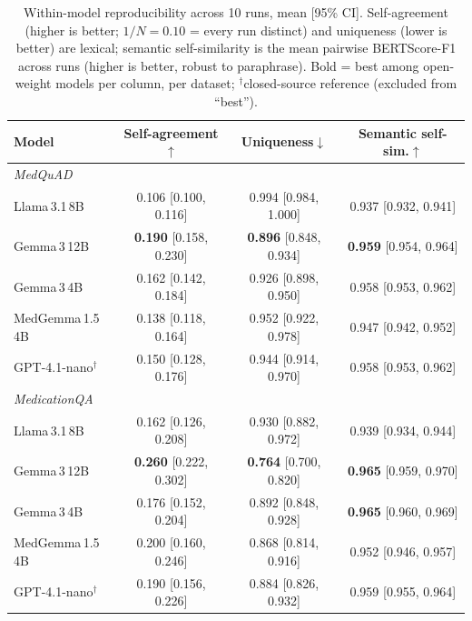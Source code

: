 \documentclass[11pt]{article}
\providecommand{\DIFaddbegin}{} %
\providecommand{\DIFaddincludegraphics}[2][]{{\color{blue}\fbox{\DIFOincludegraphics[#1]{#2}}}} %
\DeclareRobustCommand{\DIFaddbegin}{\DIFOaddbegin \let\includegraphics\DIFaddincludegraphics} %
\begin{document}
\DIFaddbegin \begin{table}[h]
\centering
\caption{Within-model reproducibility across 10 runs, mean [95\% CI].
Self-agreement (higher is better; $1/N{=}0.10$ = every run distinct) and
uniqueness (lower is better) are lexical; semantic self-similarity is the
mean pairwise BERTScore-F1 across runs (higher is better, robust to
paraphrase). Bold = best among open-weight models per column, per dataset;
$^\dagger$closed-source reference (excluded from ``best'').}
\label{tab:repro}
\footnotesize
\begin{tabular}{lccc}
\toprule
\textbf{Model} & \textbf{Self-agreement}$\uparrow$ & \textbf{Uniqueness}$\downarrow$ & \textbf{Semantic self-sim.}$\uparrow$ \\
\midrule
\multicolumn{4}{l}{\emph{MedQuAD}}\\
Llama\,3.1\,8B      & 0.106 [0.100, 0.116] & 0.994 [0.984, 1.000] & 0.937 [0.932, 0.941] \\
Gemma\,3\,12B       & \textbf{0.190} [0.158, 0.230] & \textbf{0.896} [0.848, 0.934] & \textbf{0.959} [0.954, 0.964] \\
Gemma\,3\,4B        & 0.162 [0.142, 0.184] & 0.926 [0.898, 0.950] & 0.958 [0.953, 0.962] \\
MedGemma\,1.5\,4B   & 0.138 [0.118, 0.164] & 0.952 [0.922, 0.978] & 0.947 [0.942, 0.952] \\
GPT-4.1-nano$^\dagger$ & 0.150 [0.128, 0.176] & 0.944 [0.914, 0.970] & 0.958 [0.953, 0.962] \\
\midrule
\multicolumn{4}{l}{\emph{MedicationQA}}\\
Llama\,3.1\,8B      & 0.162 [0.126, 0.208] & 0.930 [0.882, 0.972] & 0.939 [0.934, 0.944] \\
Gemma\,3\,12B       & \textbf{0.260} [0.222, 0.302] & \textbf{0.764} [0.700, 0.820] & \textbf{0.965} [0.959, 0.970] \\
Gemma\,3\,4B        & 0.176 [0.152, 0.204] & 0.892 [0.848, 0.928] & \textbf{0.965} [0.960, 0.969] \\
MedGemma\,1.5\,4B   & 0.200 [0.160, 0.246] & 0.868 [0.814, 0.916] & 0.952 [0.946, 0.957] \\
GPT-4.1-nano$^\dagger$ & 0.190 [0.156, 0.226] & 0.884 [0.826, 0.932] & 0.959 [0.955, 0.964] \\
\bottomrule
\end{tabular}
\end{table}
\end{document}
